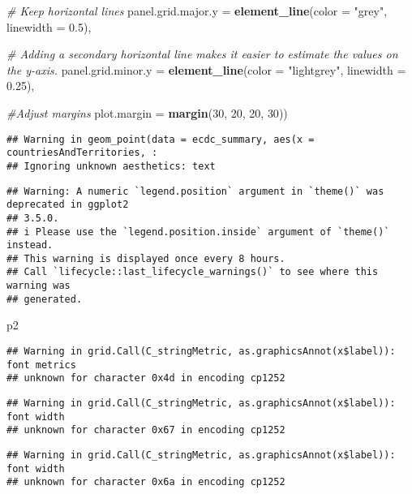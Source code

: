 \documentclass[
]{article}
\newenvironment{Shaded}{\begin{snugshade}}{\end{snugshade}}
\newcommand{\AttributeTok}[1]{\textcolor[rgb]{0.13,0.29,0.53}{#1}}
\newcommand{\CommentTok}[1]{\textcolor[rgb]{0.56,0.35,0.01}{\textit{#1}}}
\newcommand{\DecValTok}[1]{\textcolor[rgb]{0.00,0.00,0.81}{#1}}
\newcommand{\FloatTok}[1]{\textcolor[rgb]{0.00,0.00,0.81}{#1}}
\newcommand{\FunctionTok}[1]{\textcolor[rgb]{0.13,0.29,0.53}{\textbf{#1}}}
\newcommand{\NormalTok}[1]{#1}
\newcommand{\StringTok}[1]{\textcolor[rgb]{0.31,0.60,0.02}{#1}}
\begin{document}
\begin{Shaded}
\begin{Highlighting}[]
    \CommentTok{\# Keep horizontal lines}
    \AttributeTok{panel.grid.major.y =} \FunctionTok{element\_line}\NormalTok{(}\AttributeTok{color =} \StringTok{"grey"}\NormalTok{, }\AttributeTok{linewidth =} \FloatTok{0.5}\NormalTok{),}
    
    \CommentTok{\# Adding a secondary horizontal line makes it easier to estimate the values on the y{-}axis. }
    \AttributeTok{panel.grid.minor.y =} \FunctionTok{element\_line}\NormalTok{(}\AttributeTok{color =} \StringTok{"lightgrey"}\NormalTok{, }\AttributeTok{linewidth =} \FloatTok{0.25}\NormalTok{),}
    
    \CommentTok{\#Adjust margins}
    \AttributeTok{plot.margin =} \FunctionTok{margin}\NormalTok{(}\DecValTok{30}\NormalTok{, }\DecValTok{20}\NormalTok{, }\DecValTok{20}\NormalTok{, }\DecValTok{30}\NormalTok{))}
\end{Highlighting}
\end{Shaded}

\begin{verbatim}
## Warning in geom_point(data = ecdc_summary, aes(x = countriesAndTerritories, :
## Ignoring unknown aesthetics: text
\end{verbatim}

\begin{verbatim}
## Warning: A numeric `legend.position` argument in `theme()` was deprecated in ggplot2
## 3.5.0.
## i Please use the `legend.position.inside` argument of `theme()` instead.
## This warning is displayed once every 8 hours.
## Call `lifecycle::last_lifecycle_warnings()` to see where this warning was
## generated.
\end{verbatim}

\begin{Shaded}
\begin{Highlighting}[]
\NormalTok{p2}
\end{Highlighting}
\end{Shaded}

\begin{verbatim}
## Warning in grid.Call(C_stringMetric, as.graphicsAnnot(x$label)): font metrics
## unknown for character 0x4d in encoding cp1252
\end{verbatim}

\begin{verbatim}
## Warning in grid.Call(C_stringMetric, as.graphicsAnnot(x$label)): font width
## unknown for character 0x67 in encoding cp1252
\end{verbatim}

\begin{verbatim}
## Warning in grid.Call(C_stringMetric, as.graphicsAnnot(x$label)): font width
## unknown for character 0x6a in encoding cp1252
\end{verbatim}
\end{document}
